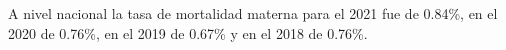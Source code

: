 A nivel nacional la tasa de mortalidad materna para el 2021 fue de 0.84\%, en el 2020 de 0.76\%, en el 2019 de 0.67\% y en el 2018 de 0.76\%. 